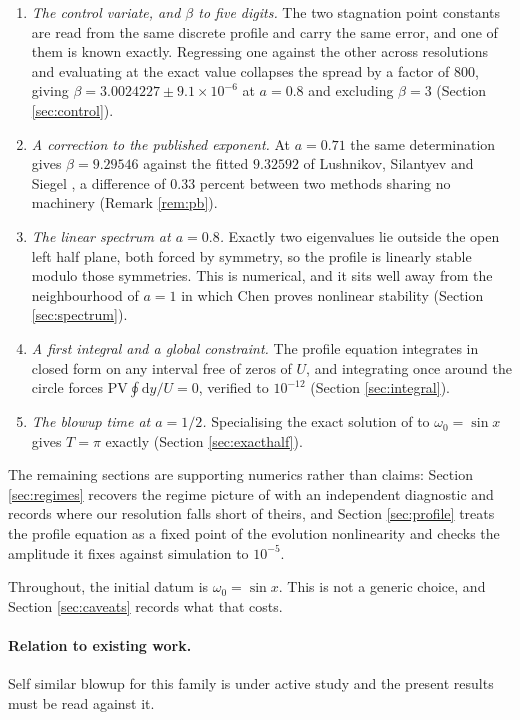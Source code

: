 \documentclass[11pt]{article}
\theoremstyle{definition}
\begin{document}
\begin{enumerate}
\item \emph{The control variate, and $\beta$ to five digits.} The two
  stagnation point constants are read from the same discrete profile and carry
  the same error, and one of them is known exactly. Regressing one against the
  other across resolutions and evaluating at the exact value collapses the
  spread by a factor of $800$, giving $\beta = 3.0024227\pm9.1\times10^{-6}$ at
  $a=0.8$ and excluding $\beta=3$ (Section \ref{sec:control}).
\item \emph{A correction to the published exponent.} At $a=0.71$ the same
  determination gives $\beta = 9.29546$ against the fitted $9.32592$ of
  Lushnikov, Silantyev and Siegel \cite{lss2020}, a difference of $0.33$ percent between two methods sharing no
  machinery (Remark \ref{rem:pb}).
\item \emph{The linear spectrum at $a=0.8$.} Exactly two eigenvalues lie
  outside the open left half plane, both forced by symmetry, so the profile is
  linearly stable modulo those symmetries. This is numerical, and it sits well
  away from the neighbourhood of $a=1$ in which Chen \cite{chenS1} proves nonlinear
  stability (Section \ref{sec:spectrum}).
\item \emph{A first integral and a global constraint.} The profile equation
  integrates in closed form on any interval free of zeros of $U$, and
  integrating once around the circle forces
  $\mathrm{PV}\oint\mathrm{d}y/U = 0$, verified to $10^{-12}$ (Section
  \ref{sec:integral}).
\item \emph{The blowup time at $a=1/2$.} Specialising the exact solution of
  \cite{slsa2025} to $\omega_0=\sin x$ gives $T=\pi$ exactly (Section
  \ref{sec:exacthalf}).
\end{enumerate}

The remaining sections are supporting numerics rather than claims: Section
\ref{sec:regimes} recovers the regime picture of \cite{lss2020} with an
independent diagnostic and records where our resolution falls short of theirs,
and Section \ref{sec:profile} treats the profile equation as a fixed point of
the evolution nonlinearity and checks the amplitude it fixes against simulation
to $10^{-5}$.

Throughout, the initial datum is $\omega_0 = \sin x$. This is not a generic
choice, and Section \ref{sec:caveats} records what that costs.

\paragraph{Relation to existing work.} Self similar blowup for this family is
under active study and the present results must be read against it.
\end{document}
